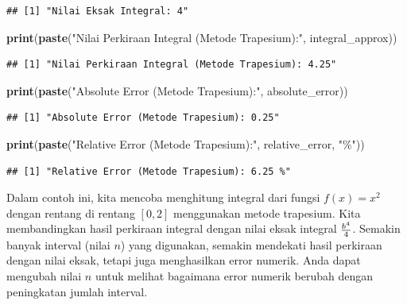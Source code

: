 \documentclass[
]{book}
\newenvironment{Shaded}{\begin{snugshade}}{\end{snugshade}}
\newcommand{\FunctionTok}[1]{\textcolor[rgb]{0.13,0.29,0.53}{\textbf{#1}}}
\newcommand{\NormalTok}[1]{#1}
\newcommand{\StringTok}[1]{\textcolor[rgb]{0.31,0.60,0.02}{#1}}
\theoremstyle{definition}
\theoremstyle{definition}
\theoremstyle{definition}
\theoremstyle{definition}
\theoremstyle{remark}
\begin{document}
\begin{verbatim}
## [1] "Nilai Eksak Integral: 4"
\end{verbatim}

\begin{Shaded}
\begin{Highlighting}[]
\FunctionTok{print}\NormalTok{(}\FunctionTok{paste}\NormalTok{(}\StringTok{"Nilai Perkiraan Integral (Metode Trapesium):"}\NormalTok{, integral\_approx))}
\end{Highlighting}
\end{Shaded}

\begin{verbatim}
## [1] "Nilai Perkiraan Integral (Metode Trapesium): 4.25"
\end{verbatim}

\begin{Shaded}
\begin{Highlighting}[]
\FunctionTok{print}\NormalTok{(}\FunctionTok{paste}\NormalTok{(}\StringTok{"Absolute Error (Metode Trapesium):"}\NormalTok{, absolute\_error))}
\end{Highlighting}
\end{Shaded}

\begin{verbatim}
## [1] "Absolute Error (Metode Trapesium): 0.25"
\end{verbatim}

\begin{Shaded}
\begin{Highlighting}[]
\FunctionTok{print}\NormalTok{(}\FunctionTok{paste}\NormalTok{(}\StringTok{"Relative Error (Metode Trapesium):"}\NormalTok{, relative\_error, }\StringTok{"\%"}\NormalTok{))}
\end{Highlighting}
\end{Shaded}

\begin{verbatim}
## [1] "Relative Error (Metode Trapesium): 6.25 %"
\end{verbatim}

Dalam contoh ini, kita mencoba menghitung integral dari fungsi \(f(x)=x^2\) dengan rentang di rentang \([0, 2]\) menggunakan metode trapesium. Kita membandingkan hasil perkiraan integral dengan nilai eksak integral \({b^4 \over 4}\). Semakin banyak interval (nilai \(n\)) yang digunakan, semakin mendekati hasil perkiraan dengan nilai eksak, tetapi juga menghasilkan error numerik. Anda dapat mengubah nilai \(n\) untuk melihat bagaimana error numerik berubah dengan peningkatan jumlah interval.
\end{document}
